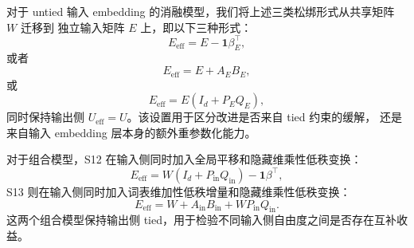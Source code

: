 对于 untied 输入 embedding 的消融模型，我们将上述三类松绑形式从共享矩阵 $W$ 迁移到
独立输入矩阵 $E$ 上，即以下三种形式：
\begin{equation}
    E_{\mathrm{eff}} = E-\mathbf{1}\beta_E^\top,
\end{equation}
或者
\begin{equation}
    E_{\mathrm{eff}} = E+A_EB_E,
\end{equation}
或
\begin{equation}
    E_{\mathrm{eff}} = E(I_d+P_EQ_E),
\end{equation}
同时保持输出侧 $U_{\mathrm{eff}}=U$。该设置用于区分改进是否来自 tied 约束的缓解，
还是来自输入 embedding 层本身的额外重参数化能力。

对于组合模型，S12 在输入侧同时加入全局平移和隐藏维乘性低秩变换：
\begin{equation}
    E_{\mathrm{eff}} =
    W(I_d+P_{\mathrm{in}}Q_{\mathrm{in}})-\mathbf{1}\beta^\top,
\end{equation}
S13 则在输入侧同时加入词表维加性低秩增量和隐藏维乘性低秩变换：
\begin{equation}
    E_{\mathrm{eff}} =
    W+A_{\mathrm{in}}B_{\mathrm{in}}+WP_{\mathrm{in}}Q_{\mathrm{in}}.
\end{equation}
这两个组合模型保持输出侧 tied，用于检验不同输入侧自由度之间是否存在互补收益。
